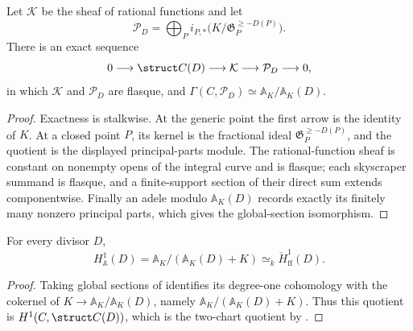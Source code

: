 \begin{proposition}
  \label{thm:adelic_principal_parts_resolution}
  \notready
  Let \(\mathcal K\) be the sheaf of rational functions and let
  \[
    \mathcal P_D=
      \bigoplus_P i_{P,*}
        \bigl(K/\mathfrak G_P^{\ge-D(P)}\bigr).
  \]
  There is an exact sequence
  \[
    0\longrightarrow\struct C(D)\longrightarrow\mathcal K
      \longrightarrow\mathcal P_D\longrightarrow0,
  \]
  in which \(\mathcal K\) and \(\mathcal P_D\) are flasque, and
  \(\Gamma(C,\mathcal P_D)\simeq
    \mathbb A_K/\mathbb A_K(D)\).
\end{proposition}
\begin{proof}
  Exactness is stalkwise.  At the generic point the first arrow is the
  identity of \(K\).  At a closed point \(P\), its kernel is the
  fractional ideal \(\mathfrak G_P^{\ge-D(P)}\), and the quotient is the
  displayed principal-parts module.  The rational-function sheaf is
  constant on nonempty opens of the integral curve and is flasque; each
  skyscraper summand is flasque, and a finite-support section of their
  direct sum extends componentwise.  Finally an adele modulo
  \(\mathbb A_K(D)\) records exactly its finitely many nonzero principal
  parts, which gives the global-section isomorphism.
\end{proof}

\begin{proposition}
  \label{thm:adelic_adele_cover_compare}
  \notready
  For every divisor \(D\),
  \[
    H^1_{\mathbb A}(D)
      =\mathbb A_K/(\mathbb A_K(D)+K)
      \simeq_k\check H^1_{\mathrm{ff}}(D).
  \]
\end{proposition}
\begin{proof}
  Taking global sections of
   identifies its degree-one
  cohomology with the cokernel of
  \(K\to\mathbb A_K/\mathbb A_K(D)\), namely
  \(\mathbb A_K/(\mathbb A_K(D)+K)\).  Thus this quotient is
  \(H^1(C,\struct C(D))\), which is the two-chart quotient by
  .
\end{proof}

